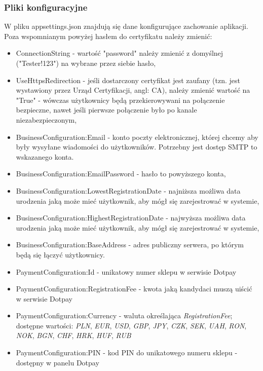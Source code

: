 \documentclass{article}
\begin{document}
\subsubsection{Pliki konfiguracyjne}
W pliku appsettings.json znajdują się dane konfigurujące zachowanie aplikacji. Poza wspomnianym powyżej hasłem do certyfikatu należy zmienić:
\begin{itemize}
    \item ConnectionString - wartość "password" należy zmienić z domyślnej \linebreak
    ("Tester!123") na wybrane przez siebie hasło,
    \item UseHttpsRedirection - jeśli dostarczony certyfikat jest zaufany (tzn. jest wystawiony przez Urząd Certyfikacji, angl: CA), należy zmienić wartość na "True" - wówczas użytkownicy będą przekierowywani na połączenie bezpieczne, nawet jeśli pierwsze połączenie było po kanale niezabezpieczonym,
    \item BusinessConfiguration:Email - konto poczty elektronicznej, której chcemy aby były wysyłane wiadomości do użytkowników. Potrzebny jest dostęp SMTP to wskazanego konta.
    \item BusinessConfiguration:EmailPassword - hasło to powyższego konta,
    \item BusinessConfiguration:LowestRegistrationDate - najniższa możliwa data urodzenia jaką może mieć użytkownik, aby mógł się zarejestrować w systemie,
    \item BusinessConfiguration:HighestRegistrationDate - najwyższa możliwa data urodzenia jaką może mieć użytkownik, aby mógł się zarejestrować w systemie,
    \item BusinessConfiguration:BaseAddress - adres publiczny serwera, po którym będą się łączyć użytkownicy.
    \item PaymentConfiguration:Id - unikatowy numer sklepu w serwisie Dotpay
    \item PaymentConfiguration:RegistrationFee - kwota jaką kandydaci muszą uiścić w serwisie Dotpay
    \item PaymentConfiguration:Currency - waluta określająca \emph{RegistrationFee}; \linebreak  dostępne wartości: \emph{PLN}, \emph{EUR}, \emph{USD}, \emph{GBP}, \emph{JPY}, \emph{CZK}, \emph{SEK}, \emph{UAH}, \emph{RON}, \emph{NOK}, \emph{BGN}, \emph{CHF}, \emph{HRK}, \emph{HUF}, \emph{RUB}
    \item PaymentConfiguration:PIN - kod PIN do unikatowego numeru sklepu - dostępny w panelu Dotpay 

\end{itemize}
\end{document}
